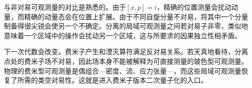 与非对易可观测量的对比是熟悉的。由于\([x,p]=i\)，精确的位置测量会扰动动量，而精确的动量态会在位置上扩展。由于不同自旋分量不对易，将其中一个分量制备得很尖锐会使另一个不确定。分离的局域可观测量之间若对易子非零，类似地意味着一个区域中的操作会扰动另一个区域，这与所要求的因果独立性相矛盾。

\begin{classroomqa}
\end{classroomqa}

下一次代数会改变。费米子产生和湮灭算符满足反对易关系。若天真地看待，分离点处的费米子场不对易，因此场本身不能被解释为可直接测量的玻色型可观测量。物理的费米型可观测量是偶组合---密度、流、应力张量---，而这些局域可观测量恢复了所需的类空对易性。这就是进入费米子版本二次量子化的入口。
